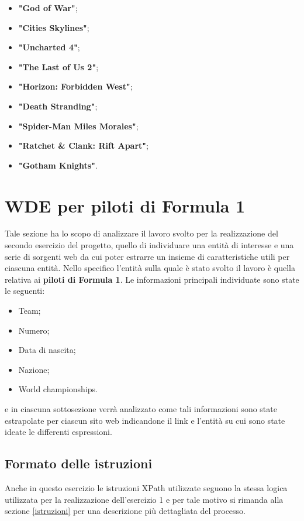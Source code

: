 \documentclass[12pt, letterpaper]{article}
\begin{document}
\begin{itemize}
	\item \textbf{"God of War"};
	\item \textbf{"Cities Skylines"};
	\item \textbf{"Uncharted 4"};
	\item \textbf{"The Last of Us 2"};
	\item \textbf{"Horizon: Forbidden West"};
	\item \textbf{"Death Stranding"};
	\item \textbf{"Spider-Man Miles Morales"};
	\item \textbf{"Ratchet \& Clank: Rift Apart"};
	\item \textbf{"Gotham Knights"}.
	
\end{itemize}

\section{WDE per piloti di Formula 1}\label{sezione2}
Tale sezione ha lo scopo di analizzare il lavoro svolto per la realizzazione del secondo esercizio del progetto, quello di individuare una entità di interesse e una serie di sorgenti web da cui poter estrarre un insieme di caratteristiche utili per ciascuna entità. Nello specifico l'entità sulla quale è stato svolto il lavoro è quella relativa ai \textbf{piloti di Formula 1}. Le informazioni principali individuate sono state le seguenti:
\begin{itemize}
    \item Team;
    \item Numero;
    \item Data di nascita;
    \item Nazione;
    \item World championships.
\end{itemize}
e in ciascuna sottosezione verrà analizzato come tali informazioni sono state estrapolate per ciascun sito web indicandone il link e l'entità su cui sono state ideate le differenti espressioni.
\subsection{Formato delle istruzioni}
Anche in questo esercizio le istruzioni XPath utilizzate seguono la stessa logica utilizzata per la realizzazione dell'esercizio 1 e per tale motivo si rimanda alla sezione \ref{istruzioni} per una descrizione più dettagliata del processo.
\end{document}
